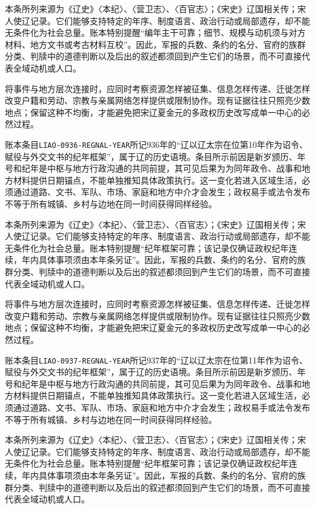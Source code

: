 本条所列来源为《辽史》〈本纪〉、〈营卫志〉、〈百官志〉；《宋史》辽国相关传；宋人使辽记录。它们能够支持特定的年序、制度语言、政治行动或局部遗存，却不能无条件化为社会总量。账本特别提醒“编年主干可靠；细节、规模与动机须与对方材料、地方文书或考古材料互校”。因此，军报的兵数、条约的名分、官府的族群分类、判牍中的道德判断以及后出的叙述都须回到产生它们的场景，而不可直接代表全域动机或人口。

将事件与地方层次连接时，应同时考察资源怎样被征集、信息怎样传递、迁徙怎样改变户籍和劳动、宗教与亲属网络怎样提供或限制协作。现有证据往往只照亮少数地点；保留这种不均衡，才能避免把宋辽夏金元的多政权历史改写成单一中心的必然过程。

账本条目\texttt{LIAO-0936-REGNAL-YEAR}所记936年的“辽以辽太宗在位第10年作为诏令、赋役与外交文书的纪年框架”，属于辽的历史语境。条目所示前因是新岁颁历、年号和纪年是中枢与地方行政沟通的共同前提，其可见后果为为同年政令、战事和地方材料提供日期锚点，不能单独推知具体政策执行。这一变化若进入区域生活，必须通过道路、文书、军队、市场、家庭和地方中介才会发生；政权易手或法令发布不等于所有城镇、乡村与边地在同一时间获得同样经验。

本条所列来源为《辽史》〈本纪〉、〈营卫志〉、〈百官志〉；《宋史》辽国相关传；宋人使辽记录。它们能够支持特定的年序、制度语言、政治行动或局部遗存，却不能无条件化为社会总量。账本特别提醒“纪年框架可靠；该记录仅确证政权纪年连续，年内具体事项须由本年条另证”。因此，军报的兵数、条约的名分、官府的族群分类、判牍中的道德判断以及后出的叙述都须回到产生它们的场景，而不可直接代表全域动机或人口。

将事件与地方层次连接时，应同时考察资源怎样被征集、信息怎样传递、迁徙怎样改变户籍和劳动、宗教与亲属网络怎样提供或限制协作。现有证据往往只照亮少数地点；保留这种不均衡，才能避免把宋辽夏金元的多政权历史改写成单一中心的必然过程。

账本条目\texttt{LIAO-0937-REGNAL-YEAR}所记937年的“辽以辽太宗在位第11年作为诏令、赋役与外交文书的纪年框架”，属于辽的历史语境。条目所示前因是新岁颁历、年号和纪年是中枢与地方行政沟通的共同前提，其可见后果为为同年政令、战事和地方材料提供日期锚点，不能单独推知具体政策执行。这一变化若进入区域生活，必须通过道路、文书、军队、市场、家庭和地方中介才会发生；政权易手或法令发布不等于所有城镇、乡村与边地在同一时间获得同样经验。

本条所列来源为《辽史》〈本纪〉、〈营卫志〉、〈百官志〉；《宋史》辽国相关传；宋人使辽记录。它们能够支持特定的年序、制度语言、政治行动或局部遗存，却不能无条件化为社会总量。账本特别提醒“纪年框架可靠；该记录仅确证政权纪年连续，年内具体事项须由本年条另证”。因此，军报的兵数、条约的名分、官府的族群分类、判牍中的道德判断以及后出的叙述都须回到产生它们的场景，而不可直接代表全域动机或人口。

